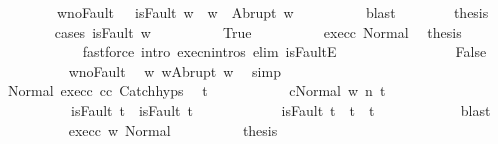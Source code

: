 \begin{isabellebody}
\ \ \ \ \ \ \ \ w{\isacharprime}{\isacharunderscore}noFault{\isacharcolon}\ \ {\isachardoublequoteopen}{\isasymnot}\ isFault\ w{\isacharprime}\ {\isasymlongrightarrow}\ w{\isacharprime}\ {\isacharequal}\ Abrupt\ w{\isachardoublequoteclose}\isanewline
\ \ \ \ \ \ \ \ \isamarkupfalse%
\ blast\isanewline
\ \ \ \ \ \ \isamarkupfalse%
\ {\isacharquery}thesis\isanewline
\ \ \ \ \ \ \isamarkupfalse%
\ {\isacharparenleft}cases\ {\isachardoublequoteopen}isFault\ w{\isacharprime}{\isachardoublequoteclose}{\isacharparenright}\isanewline
\ \ \ \ \ \ \ \ \isamarkupfalse%
\ True\isanewline
\ \ \ \ \ \ \ \ \isamarkupfalse%
\ exec{\isacharunderscore}c{}{\isacharprime}\ Normal\ \isamarkupfalse%
\ {\isacharquery}thesis\isanewline
\ \ \ \ \ \ \ \ \ \ \isamarkupfalse%
\ {\isacharparenleft}fastforce\ intro{\isacharcolon}\ execn{\isachardot}intros\ elim{\isacharcolon}\ isFaultE{\isacharparenright}\isanewline
\ \ \ \ \ \ \isamarkupfalse%
\isanewline
\ \ \ \ \ \ \ \ \isamarkupfalse%
\ False\isanewline
\ \ \ \ \ \ \ \ \isamarkupfalse%
\ w{\isacharprime}{\isacharunderscore}noFault\ \isamarkupfalse%
\ w{\isacharprime}{\isacharcolon}\ {\isachardoublequoteopen}w{\isacharprime}{\isacharequal}Abrupt\ w{\isachardoublequoteclose}\ \isamarkupfalse%
\ simp\isanewline
\ \ \ \ \ \ \ \ \isamarkupfalse%
\ Normal\ exec{\isacharunderscore}c{}\ c{}{\isacharunderscore}c{}{\isacharprime}\ Catch{\isachardot}hyps\ \isamarkupfalse%
\ t{\isacharprime}\ \isanewline
\ \ \ \ \ \ \ \ \ \ {\isachardoublequoteopen}{\isasymGamma}{\isasymturnstile}{\isasymlangle}c{}{\isacharprime}{\isacharcomma}Normal\ w{\isasymrangle}\ {\isacharequal}n{\isasymRightarrow}\ t{\isacharprime}{\isachardoublequoteclose}\ \isanewline
\ \ \ \ \ \ \ \ \ \ {\isachardoublequoteopen}isFault\ t\ {\isasymlongrightarrow}\ isFault\ t{\isacharprime}{\isachardoublequoteclose}\ \isanewline
\ \ \ \ \ \ \ \ \ \ {\isachardoublequoteopen}{\isasymnot}\ isFault\ t{\isacharprime}\ {\isasymlongrightarrow}\ t{\isacharprime}\ {\isacharequal}\ t{\isachardoublequoteclose}\isanewline
\ \ \ \ \ \ \ \ \ \ \isamarkupfalse%
\ blast\isanewline
\ \ \ \ \ \ \ \ \isamarkupfalse%
\ exec{\isacharunderscore}c{}{\isacharprime}\ w{\isacharprime}\ Normal\isanewline
\ \ \ \ \ \ \ \ \isamarkupfalse%
\ {\isacharquery}thesis\isanewline

\end{isabellebody}
